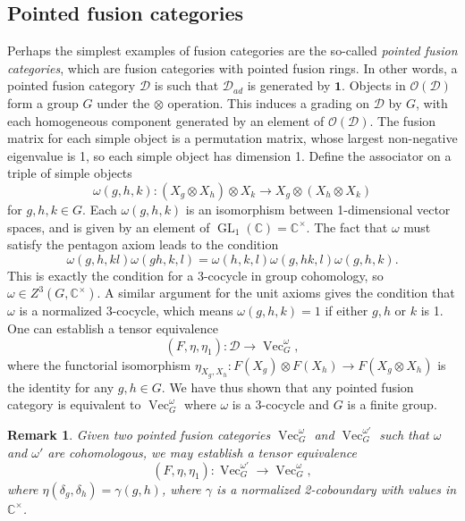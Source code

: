 \documentclass[a4paper, 10pt]{book}
\newtheorem{Rem}[theorem]{Remark}
\theoremstyle{definition}
\numberwithin{equation}{chapter}
\newcommand\ot{\otimes}
\newcommand\Vect{\operatorname{Vec}}
\newcommand\GL{\operatorname{GL}}
\newcommand\CC{\mathbb C}
\newcommand\kk{\mathbb C}
\newcommand\OO{\mathcal O}
\newcommand\D{\mathcal D}
\newcommand\one{\mathbf{1}}
\begin{document}
\subsection{Pointed fusion categories}\label{pfc}
Perhaps the simplest examples of fusion categories are the so-called \textit{pointed fusion categories}, which are fusion categories with pointed fusion rings. In other words, a pointed fusion category $\D$ is such that $\D_{ad}$ is generated by $\one$. Objects in  $\OO(\D)$ form a group $G$ under the $\ot$ operation. This induces a grading on $\D$ by $G$, with each homogeneous component generated by an element of $\OO(\D)$.  The fusion matrix for each simple object is a permutation matrix, whose largest non-negative eigenvalue is 1, so each simple object has dimension 1. 
Define the associator on a triple of simple objects\begin{equation*}
	\omega(g,h,k):(X_g \otimes X_h) \otimes X_k \rightarrow    X_g \otimes (X_h\otimes X_k)
\end{equation*} for $g, h, k \in G$. 
 Each $\omega(g,h,k)$ is an isomorphism between 1-dimensional vector spaces, and is given by an element of $\GL_1(\kk) = \kk^\times$.  The fact that $\omega$ must satisfy the pentagon axiom leads to the condition \begin{equation*}
	\omega(g,h, kl)\omega(gh, k, l) = \omega(h,k,l)\omega(g, hk, l)\omega(g,h,k).
\end{equation*} This is exactly the condition for a 3-cocycle in group cohomology, so $\omega \in Z^3(G, \CC^\times)$.  A similar argument for the unit axioms gives the condition that $\omega$ is a normalized 3-cocycle, which means $\omega(g, h, k)=1$ if either $g, h$ or $k$ is 1. One can establish a tensor equivalence \begin{equation*}
	(F, \eta, \eta_1): \D \rightarrow \Vect^\omega_G,
\end{equation*} where the functorial isomorphism $\eta_{X_g,X_h}: F(X_g)\otimes F(X_h) \rightarrow F(X_g\otimes X_h)$ is the identity for any $g, h\in G$.  We have thus shown that any pointed fusion category is equivalent to $\Vect^\omega_G$ where $\omega$ is a 3-cocycle and $G$ is a finite group. 
\begin{Rem}\rm
Given two pointed fusion categories $\Vect^\omega_G$ and $\Vect^{\omega'}_G$ such that $\omega $ and $\omega'$ are cohomologous, we may establish a tensor equivalence \begin{equation}
	(F, \eta, \eta_1): \Vect^{\omega'}_G \rightarrow \Vect^\omega_G,
\end{equation} where $\eta(\delta_g, \delta_h) = \gamma(g, h)$, where $\gamma$ is a normalized 2-coboundary with values in $\kk^\times$.
\end{Rem}
\end{document}
